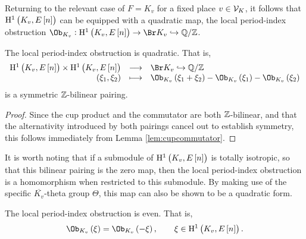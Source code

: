 Returning to the relevant case of $ F = K_v $ for a fixed place $ v \in \mathcal{V}_K $, it follows that $ \HE[n]{K_v} $ can be equipped with a quadratic map, the local period-index obstruction $ \Ob_{K_v} : \HE[n]{K_v} \to \Br K_v \hookrightarrow \QQ / \ZZ $.

\pagebreak

\begin{corollary}
\label{cor:localquadratic}
The local period-index obstruction is quadratic. That is,
$$ \function{\HE[n]{K_v} \times \HE[n]{K_v}}{\Br K_v \hookrightarrow \QQ / \ZZ}{\br{\xi_1, \xi_2}}{\Ob_{K_v}\br{\xi_1 + \xi_2} - \Ob_{K_v}\br{\xi_1} - \Ob_{K_v}\br{\xi_2}} $$
is a symmetric $ \mathbb{Z} $-bilinear pairing.
\end{corollary}

\begin{proof}
Since the cup product and the commutator are both $ \mathbb{Z} $-bilinear, and that the alternativity introduced by both pairings cancel out to establish symmetry, this follows immediately from Lemma \ref{lem:cupcommutator}.
\end{proof}

It is worth noting that if a submodule of $ \HE[n]{K_v} $ is totally isotropic, so that this bilinear pairing is the zero map, then the local period-index obstruction is a homomorphism when restricted to this submodule. By making use of the specific $ \overline{K_v} $-theta group $ \Theta $, this map can also be shown to be a quadratic form.

\begin{proposition}
\label{prop:localeven}
The local period-index obstruction is even. That is,
$$ \Ob_{K_v}\br{\xi} = \Ob_{K_v}\br{-\xi}, \qquad \xi \in \HE[n]{K_v}. $$
\end{proposition}


